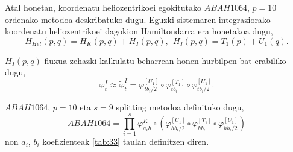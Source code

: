 Atal honetan, koordenatu heliozentrikoei egokitutako $ABAH1064$, $p=10$ ordenako metodoa deskribatuko dugu.  
Eguzki-sistemaren integraziorako koordenatu heliozentrikoei dagokion Hamiltondarra era honetakoa dugu,
\begin{equation*}
H_{Hel}(p,q)=H_K(p,q)+H_I(p,q), \ \ H_I(p,q)=T_1(p)+U_1(q). 
\end{equation*}

$H_I(p,q)$ fluxua zehazki kalkulatu beharrean honen hurbilpen bat erabiliko dugu,
\begin{equation*}
\varphi_t^I \approx \tilde{\varphi}_t^I= \varphi_{{tb_i}/{2}}^{[U_1]} \circ \varphi_{tb_i}^{[T_1]} \circ \varphi_{{tb_i}/{2}}^{[U_1]}.
\end{equation*}

$ABAH1064$, $p=10$ eta $s=9$ splitting metodoa definituko dugu,
\begin{equation*}
ABAH1064=\prod\limits_{i=1}^{s} \varphi_{a_ih}^K \circ (\varphi_{{hb_i}/{2}}^{[U_1]} \circ \varphi_{hb_i}^{[T_1]} \circ \varphi_{{hb_i}/{2}}^{[U_1]})
\end{equation*}
non $a_i$, $b_i$ koefizienteak \ref{tab:33} taulan definitzen diren.  

\begin{table}
\centering
\caption[$ABAH1064$ splitting metodoa.] 
{\small{$ABAH1064$ splitting metodoa \cite{Blanes2013}.}}
\label{tab:33}       %
\centering
{}
\end{table}




